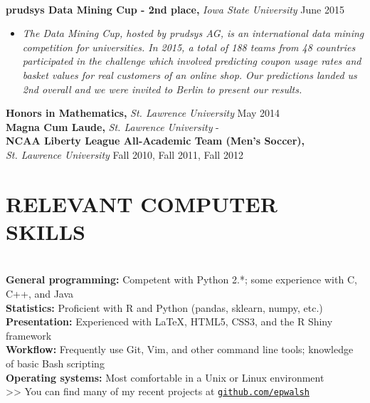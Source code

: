 \documentclass{res} %
\begin{document}
\begin{resume}
\hrulefill \\
{\bf prudsys Data Mining Cup - 2nd place,} {\sl Iowa State University} \dotfill June 2015 
\begin{itemize}[label=>>]
  \item \emph{The Data Mining Cup, hosted by prudsys AG, is an international data
    mining competition for universities. In 2015, a total of 188 teams from 48
    countries participated in the challenge which involved predicting coupon
    usage rates and basket values for real customers of an online shop. Our
    predictions landed us 2nd overall and we were invited to Berlin to
    present our results.}
\end{itemize}
\vspace{-1em}
{\bf Honors in Mathematics,} {\sl St. Lawrence University} \dotfill May 2014 \\
{\bf Magna Cum Laude,} {\sl St. Lawrence University} \hfill - \\
{\bf NCAA Liberty League All-Academic Team (Men's Soccer),} \\
{\sl St. Lawrence University} \dotfill Fall 2010, Fall 2011, Fall 2012 


\section{RELEVANT COMPUTER SKILLS}

\hrulefill \\
{\bf General programming:} Competent with Python 2.*; some experience with C, C++, and Java \\
{\bf Statistics:} Proficient with R and Python (pandas, sklearn, numpy, etc.) \\
{\bf Presentation:} Experienced with \LaTeX, HTML5, CSS3, and the R Shiny framework \\
{\bf Workflow:} Frequently use Git, Vim, and other command line tools; knowledge of basic Bash scripting \\
{\bf Operating systems:} Most comfortable in a Unix or Linux environment \\
>> You can find many of my recent projects at \href{http://github.com/epwalsh}{\texttt{github.com/epwalsh}}



\end{resume}
\end{document}
